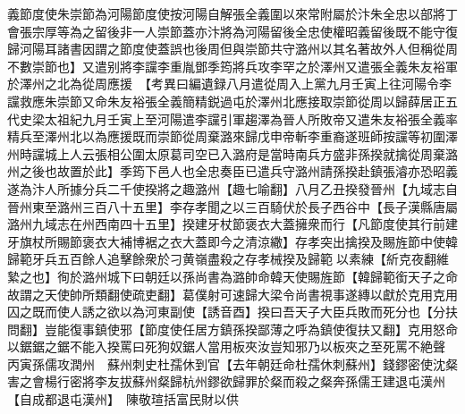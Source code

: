 義節度使朱崇節為河陽節度使按河陽自解張全義圍以來常附屬於汴朱全忠以部將丁會張宗厚等為之留後非一人崇節蓋亦汴將為河陽留後全忠使權昭義留後既不能守復歸河陽耳諸書因謂之節度使蓋誤也後周但與崇節共守潞州以其名著故外人但稱從周不數崇節也】又遣别將李讜李重胤鄧季筠將兵攻李罕之於澤州又遣張全義朱友裕軍於澤州之北為從周應援　【考異曰編遺録八月遣從周入上黨九月壬寅上往河陽令李讜救應朱崇節又命朱友裕張全義簡精鋭過屯於澤州北應接取崇節從周以歸薛居正五代史梁太祖紀九月壬寅上至河陽遣李讜引軍趨澤為晉人所敗帝又遣朱友裕張全義率精兵至澤州北以為應援既而崇節從周棄潞來歸戊申帝斬李重裔遂班師按讜等初圍澤州時讜城上人云張相公圍太原葛司空已入潞府是當時南兵方盛非孫揆就擒從周棄潞州之後也故置於此】季筠下邑人也全忠奏臣已遣兵守潞州請孫揆赴鎮張濬亦恐昭義遂為汴人所據分兵二千使揆將之趣潞州【趣七喻翻】八月乙丑揆發晉州【九域志自晉州東至潞州三百八十五里】李存孝聞之以三百騎伏於長子西谷中【長子漢縣唐屬潞州九域志在州西南四十五里】揆建牙杖節褒衣大蓋擁衆而行【凡節度使其行前建牙旗杖所賜節褒衣大補博裾之衣大蓋即今之清涼繖】存孝突出擒揆及賜旌節中使韓歸範牙兵五百餘人追擊餘衆於刁黄嶺盡殺之存孝械揆及歸範以素練【紤克夜翻維縶之也】徇於潞州城下曰朝廷以孫尚書為潞帥命韓天使賜旌節【韓歸範銜天子之命故謂之天使帥所類翻使疏吏翻】葛僕射可速歸大梁令尚書視事遂縳以獻於克用克用囚之既而使人誘之欲以為河東副使【誘音酉】揆曰吾天子大臣兵敗而死分也【分扶問翻】豈能復事鎮使邪【節度使任居方鎮孫揆鄙薄之呼為鎮使復扶又翻】克用怒命以鋸鋸之鋸不能入揆罵曰死狗奴鋸人當用板夾汝豈知邪乃以板夾之至死罵不絶聲　丙寅孫儒攻潤州　蘇州刺史杜孺休到官【去年朝廷命杜孺休刺蘇州】錢鏐密使沈粲害之會楊行密將李友拔蘇州粲歸杭州鏐欲歸罪於粲而殺之粲奔孫儒王建退屯漢州【自成都退屯漢州】　陳敬瑄括富民財以供

